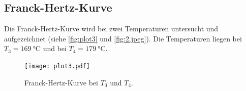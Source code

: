 \subsection{Franck-Hertz-Kurve} %
\label{sub:Franck-Hertz-Kurve}
Die Franck-Hertz-Kurve wird bei zwei Temperaturen untersucht und aufgezeichnet (siehe \autoref{fig:plot3} und \autoref{fig:2.jpeg}). 
Die Temperaturen liegen bei $T_3= \qty{169}{\celsius}$ und bei $T_4= \qty{179}{\celsius}$.

\begin{figure}
  \centering
  \texttt{[image: plot3.pdf]}
  \caption{Franck-Hertz-Kurve bei $T_3$ und $T_4$.}
  \label{fig:plot3}
\end{figure}







